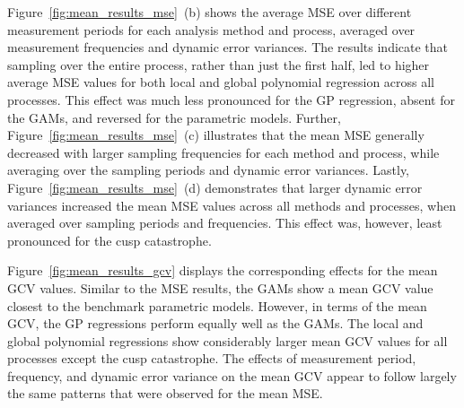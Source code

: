 \documentclass[man, floatsintext]{apa7}
\begin{document}
\begin{sidewaysfigure*}[htbp]
  \caption{Mean MSE effects across all processes, analysis
    methods, and simulation conditions}
  \label{fig:mean_results_mse}
\end{sidewaysfigure*}

Figure~\ref{fig:mean_results_mse}~(b) shows the average MSE over different
measurement periods for each analysis method and process, averaged over
measurement frequencies and dynamic error variances. The results indicate that
sampling over the entire process, rather than just the first half, led to
higher average MSE values for both local and global polynomial regression
across all processes. This effect was much less pronounced for the GP
regression, absent for the GAMs, and reversed for the parametric models.
Further, Figure~\ref{fig:mean_results_mse}~(c) illustrates that the mean MSE
generally decreased with larger sampling frequencies for each method and
process, while averaging over the sampling periods and dynamic error variances.
Lastly, Figure~\ref{fig:mean_results_mse}~(d) demonstrates that larger dynamic
error variances increased the mean MSE values across all methods and processes,
when averaged over sampling periods and frequencies. This effect was, however,
least pronounced for the cusp catastrophe.

Figure~\ref{fig:mean_results_gcv} displays the corresponding effects for the
mean GCV values. Similar to the MSE results, the GAMs show a mean GCV value
closest to the benchmark parametric models. However, in terms of the mean GCV,
the GP regressions perform equally well as the GAMs. The local and global
polynomial regressions show considerably larger mean GCV values for all
processes except the cusp catastrophe. The effects of measurement period,
frequency, and dynamic error variance on the mean GCV appear to follow largely
the same patterns that were observed for the mean MSE\@.

\begin{sidewaysfigure*}[htbp]
  \caption{Mean GCV effects across all processes, analysis
    methods, and simulation conditions}
  \label{fig:mean_results_gcv}
\end{sidewaysfigure*}
\end{document}
